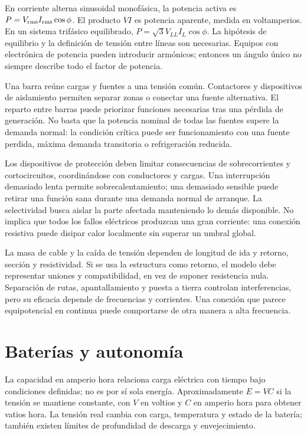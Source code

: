 En corriente alterna sinusoidal monofásica, la potencia activa es $P=V_{\rm rms}I_{\rm rms}\cos\phi$. El producto $VI$ es potencia aparente, medida en voltamperios. En un sistema trifásico equilibrado, $P=\sqrt{3}V_{LL}I_L\cos\phi$. La hipótesis de equilibrio y la definición de tensión entre líneas son necesarias. Equipos con electrónica de potencia pueden introducir armónicos; entonces un ángulo único no siempre describe todo el factor de potencia.

Una barra reúne cargas y fuentes a una tensión común. Contactores y dispositivos de aislamiento permiten separar zonas o conectar una fuente alternativa. El reparto entre barras puede priorizar funciones necesarias tras una pérdida de generación. No basta que la potencia nominal de todas las fuentes supere la demanda normal: la condición crítica puede ser funcionamiento con una fuente perdida, máxima demanda transitoria o refrigeración reducida.

Los dispositivos de protección deben limitar consecuencias de sobrecorrientes y cortocircuitos, coordinándose con conductores y cargas. Una interrupción demasiado lenta permite sobrecalentamiento; una demasiado sensible puede retirar una función sana durante una demanda normal de arranque. La selectividad busca aislar la parte afectada manteniendo lo demás disponible. No implica que todos los fallos eléctricos produzcan una gran corriente: una conexión resistiva puede disipar calor localmente sin superar un umbral global.

La masa de cable y la caída de tensión dependen de longitud de ida y retorno, sección y resistividad. Si se usa la estructura como retorno, el modelo debe representar uniones y compatibilidad, en vez de suponer resistencia nula. Separación de rutas, apantallamiento y puesta a tierra controlan interferencias, pero su eficacia depende de frecuencias y corrientes. Una conexión que parece equipotencial en continua puede comportarse de otra manera a alta frecuencia.

\section{Baterías y autonomía}
La capacidad en amperio hora relaciona carga eléctrica con tiempo bajo condiciones definidas; no es por sí sola energía. Aproximadamente $E=VC$ si la tensión se mantiene constante, con $V$ en voltios y $C$ en amperio hora para obtener vatios hora. La tensión real cambia con carga, temperatura y estado de la batería; también existen límites de profundidad de descarga y envejecimiento.

